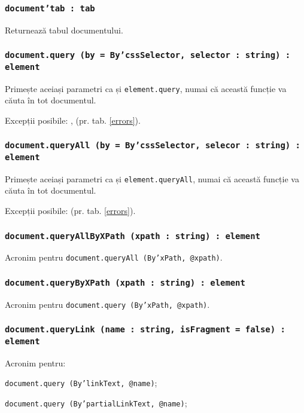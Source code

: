 \subsubsection{\texttt{document'tab : tab}}

Returnează tabul documentului.

\subsubsection{\texttt{document.query (by = By'cssSelector, selector : string) : element}}

Primește aceiași parametri ca și  \texttt{element.query}, numai că această funcție va căuta în tot documentul.

Excepții posibile: ,  (pr. tab. \ref{errors}).

\subsubsection{\texttt{document.queryAll (by = By'cssSelector, selecor : string) : element}}

Primește aceiași parametri ca și \texttt{element.queryAll}, numai că această funcție va căuta în tot documentul.

Excepții posibile:  (pr. tab. \ref{errors}).

\subsubsection{\texttt{document.queryAllByXPath (xpath : string) : element}}

Acronim pentru \texttt{document.queryAll (By'xPath, @xpath)}.

\subsubsection{\texttt{document.queryByXPath (xpath : string) : element}}

Acronim pentru \texttt{document.query (By'xPath, @xpath)}.

\subsubsection{\texttt{document.queryLink (name : string, isFragment = false) : element}}

Acronim pentru:
\begin{icItems}
	\item \texttt{document.query (By'linkText, @name)};
	\item \texttt{document.query (By'partialLinkText, @name)};
\end{icItems}

